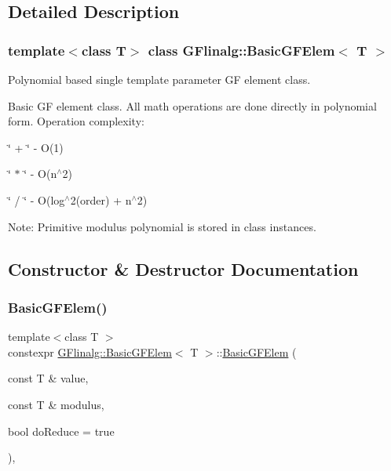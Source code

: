 \subsection{Detailed Description}
\subsubsection*{template$<$class T$>$\newline
class G\+Flinalg\+::\+Basic\+G\+F\+Elem$<$ T $>$}

Polynomial based single template parameter GF element class. 

Basic GF element class. All math operations are done directly in polynomial form. Operation complexity\+:
\begin{DoxyItemize}
\item \char`\"{} + \char`\"{} -\/ O(1)
\item \char`\"{} $\ast$ \char`\"{} -\/ O(n$^\wedge$2)
\item \char`\"{} / \char`\"{} -\/ O(log$^\wedge$2(order) + n$^\wedge$2)
\end{DoxyItemize}

Note\+: Primitive modulus polynomial is stored in class instances. 

\subsection{Constructor \& Destructor Documentation}
\mbox{\label{class_g_flinalg_1_1_basic_g_f_elem_aae794a7c05d6cb24c3bfe13f92a14548}} 
\subsubsection{\texorpdfstring{BasicGFElem()}{BasicGFElem()}\hspace{0.1cm}{\footnotesize\ttfamily [1/3]}}
{\footnotesize\ttfamily template$<$class T $>$ \\
constexpr \mbox{\hyperlink{class_g_flinalg_1_1_basic_g_f_elem}{G\+Flinalg\+::\+Basic\+G\+F\+Elem}}$<$ T $>$\+::\mbox{\hyperlink{class_g_flinalg_1_1_basic_g_f_elem}{Basic\+G\+F\+Elem}} (\begin{DoxyParamCaption}\item[{const T \&}]{value,  }\item[{const T \&}]{modulus,  }\item[{bool}]{do\+Reduce = {\ttfamily true} }\end{DoxyParamCaption})\hspace{0.3cm}{\ttfamily [inline]}, {\ttfamily [explicit]}}



